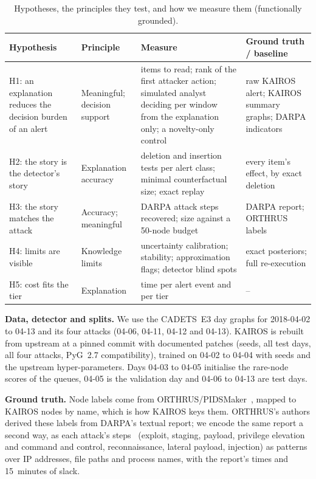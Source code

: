 \documentclass[conference]{IEEEtran}
\begin{document}
\begin{table}[t]
\centering\small
\caption{Hypotheses, the principles they test, and how we measure them (functionally grounded).}
\label{tab:hypotheses}
\begin{tabular}{p{}p{}p{}p{}}
\toprule
Hypothesis & Principle & Measure & Ground truth / baseline\\
\midrule
H1: an explanation reduces the decision burden of an alert & Meaningful; decision support & items to read; rank of the first attacker action; simulated analyst deciding per window from the explanation only; a novelty-only control & raw KAIROS alert; KAIROS summary graphs; DARPA indicators\\
H2: the story is the detector's story & Explanation accuracy & deletion and insertion tests per alert class; minimal counterfactual size; exact replay & every item's effect, by exact deletion\\
H3: the story matches the attack & Accuracy; meaningful & DARPA attack steps recovered; size against a 50-node budget & DARPA report; ORTHRUS labels\\
H4: limits are visible & Knowledge limits & uncertainty calibration; stability; approximation flags; detector blind spots & exact posteriors; full re-execution\\
H5: cost fits the tier & Explanation & time per alert event and per tier & --\\
\bottomrule
\end{tabular}
\end{table}

\textbf{Data, detector and splits.} We use the CADETS~E3 day graphs for 2018-04-02 to 04-13 and its four
attacks (04-06, 04-11, 04-12 and 04-13). KAIROS is rebuilt from upstream at a pinned commit with
documented patches (seeds, all test days, all four attacks, PyG~2.7 compatibility), trained on 04-02 to
04-04 with \NumSeeds{} seeds and the upstream hyper-parameters. Days 04-03 to 04-05 initialise the
rare-node scores of the queues, 04-05 is the validation day and 04-06 to 04-13 are test days.

\textbf{Ground truth.} Node labels come from ORTHRUS/PIDSMaker~\cite{orthrus,bilot}, mapped to KAIROS
nodes by name, which is how KAIROS keys them. ORTHRUS's authors derived these labels from DARPA's textual
report; we encode the same report a second way, as each attack's steps~\cite{darpa} (exploit, staging, payload, privilege elevation and command and control, reconnaissance, lateral
payload, injection) as patterns over IP addresses, file paths and process names, with the report's times
and 15~minutes of slack.
\end{document}
